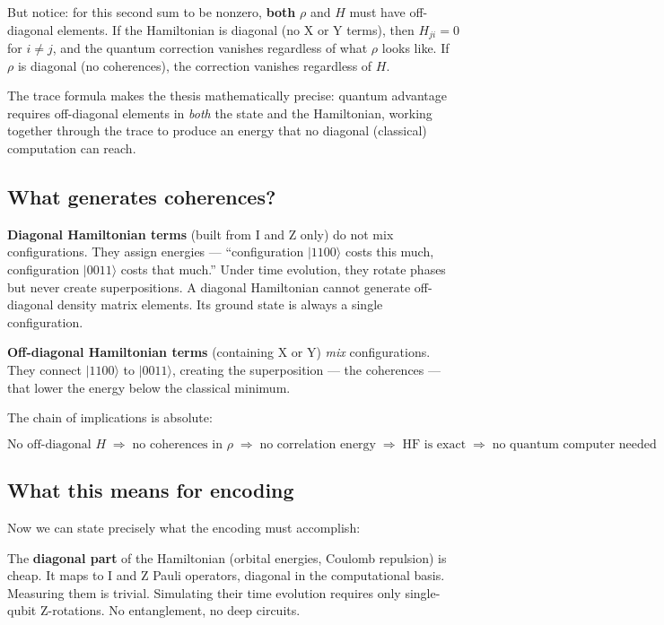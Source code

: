 \documentclass[
  11pt,
  oneside]{book}
\begin{document}
But notice: for this second sum to be nonzero, \textbf{both} \(\rho\)
and \(H\) must have off-diagonal elements. If the Hamiltonian is
diagonal (no X or Y terms), then \(H_{ji} = 0\) for \(i \neq j\), and
the quantum correction vanishes regardless of what \(\rho\) looks like.
If \(\rho\) is diagonal (no coherences), the correction vanishes
regardless of \(H\).

The trace formula makes the thesis mathematically precise: quantum
advantage requires off-diagonal elements in \emph{both} the state and
the Hamiltonian, working together through the trace to produce an energy
that no diagonal (classical) computation can reach.

\subsection{What generates coherences?}\label{what-generates-coherences}

\textbf{Diagonal Hamiltonian terms} (built from I and Z only) do not mix
configurations. They assign energies --- ``configuration
\(\lvert 1100\rangle\) costs this much, configuration
\(\lvert 0011\rangle\) costs that much.'' Under time evolution, they
rotate phases but never create superpositions. A diagonal Hamiltonian
cannot generate off-diagonal density matrix elements. Its ground state
is always a single configuration.

\textbf{Off-diagonal Hamiltonian terms} (containing X or Y) \emph{mix}
configurations. They connect \(\lvert 1100\rangle\) to
\(\lvert 0011\rangle\), creating the superposition --- the coherences
--- that lower the energy below the classical minimum.

The chain of implications is absolute:

\[\text{No off-diagonal } H \;\Rightarrow\; \text{no coherences in } \rho \;\Rightarrow\; \text{no correlation energy} \;\Rightarrow\; \text{HF is exact} \;\Rightarrow\; \text{no quantum computer needed}\]

\subsection{What this means for
encoding}\label{what-this-means-for-encoding}

Now we can state precisely what the encoding must accomplish:

The \textbf{diagonal part} of the Hamiltonian (orbital energies, Coulomb
repulsion) is cheap. It maps to I and Z Pauli operators, diagonal in the
computational basis. Measuring them is trivial. Simulating their time
evolution requires only single-qubit Z-rotations. No entanglement, no
deep circuits.
\end{document}
